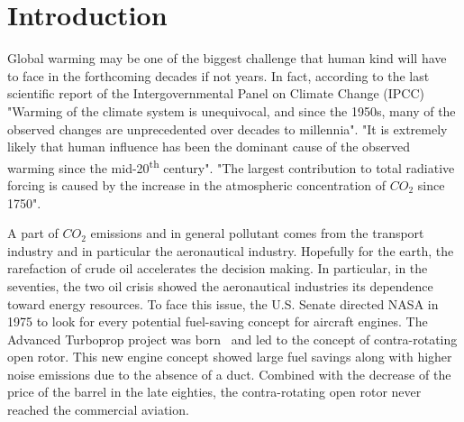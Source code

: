 
\chapter{Introduction}

Global warming may be one of the biggest challenge that human kind
will have to face in the forthcoming decades if not years.
In fact, according to the last scientific
report of the Intergovernmental Panel on Climate Change 
(IPCC)~\cite{IPCC2013}
"Warming of the climate system is unequivocal, 
and since the 1950s, many of the observed 
changes are unprecedented over decades to millennia".
"It is extremely likely that human influence has 
been the dominant cause of the 
observed warming since the mid-20\textsuperscript{th} 
century".
"The largest contribution to total radiative 
forcing is caused by the increase in the atmospheric 
concentration of $CO_2$ since 1750".

A part of $CO_2$ emissions and in general pollutant comes from the
transport industry and in particular the
aeronautical industry. 
Hopefully for the earth,
the rarefaction of crude oil accelerates the decision making.
In particular, in the seventies, the two oil crisis showed the aeronautical 
industries its dependence toward energy resources. 
To face this issue, the U.S. Senate directed NASA in 1975
to look for every potential fuel-saving concept for aircraft
engines. The Advanced Turboprop
project was born~\cite{Hager1988} and led to the
concept of contra-rotating open rotor. This new
engine concept showed large fuel savings
along with higher noise emissions due to the absence of
a duct. Combined with the decrease of the price of the
barrel in the late eighties, the contra-rotating open rotor 
never reached the commercial aviation.

